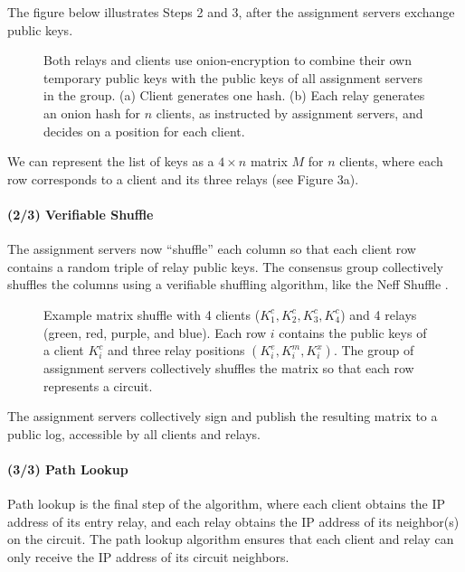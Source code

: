 The figure below illustrates Steps 2 and 3, after the assignment servers
exchange public keys.

\begin{figure}[htbp]
  \centering
  \caption{Both relays and clients use onion-encryption to combine their own
  temporary public keys with the public keys of all assignment servers in the group. (a) Client generates one hash. (b) Each relay generates an onion hash for $n$ clients, as instructed by assignment servers, and decides on a position
  for each client.}
\end{figure}

We can represent the list of keys as a $4 \times n$ matrix $M$ for $n$ clients, where each row corresponds to a client and its three relays (see Figure 3a). 

\paragraph{(2/3) Verifiable Shuffle} The assignment servers now ``shuffle''
each column so that each client row contains a random triple of relay public
keys. The consensus group collectively shuffles the columns using a verifiable
shuffling algorithm, like the Neff Shuffle \cite{neff2001verifiable}.

\begin{figure}[htb]
\centering
\hspace{\fill}%
\hspace{\fill}%
\hspace*{\fill}%
\caption[bla]{Example matrix shuffle with 4 clients ($K^c_1, K^c_2, K^c_3, K^c_4$) and 4 relays (green, red, purple, and blue). Each row $i$ contains the public keys of a client $K^c_i$ and three relay positions $(K^e_i, K^m_i, K^x_i)$. The
group of assignment servers collectively shuffles the matrix so that each row represents a circuit.}
\end{figure}

The assignment servers collectively sign and publish the resulting matrix to a
public log, accessible by all clients and relays.

\paragraph{(3/3) Path Lookup}
Path lookup is the final step of the algorithm, where each client obtains the
IP address of its entry relay, and each relay obtains the IP address of its
neighbor(s) on the circuit. The path lookup algorithm ensures that each client
and relay can only receive the IP address of its circuit neighbors.

